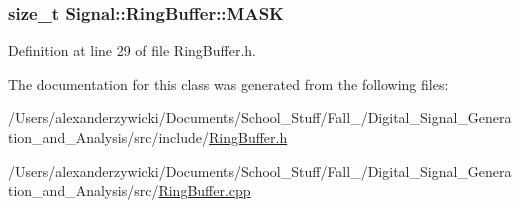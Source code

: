 \hypertarget{class_signal_1_1_ring_buffer_a6f0dc159e6d625b8352988c6a0577ffe}{
\subsubsection[{M\+A\+S\+K}]{\setlength{\rightskip}{0pt plus 5cm}size\+\_\+t Signal\+::\+Ring\+Buffer\+::\+M\+A\+S\+K\hspace{0.3cm}{\ttfamily [protected]}}}\label{class_signal_1_1_ring_buffer_a6f0dc159e6d625b8352988c6a0577ffe}


Definition at line 29 of file Ring\+Buffer.\+h.



The documentation for this class was generated from the following files\+:\begin{DoxyCompactItemize}
\item 
/\+Users/alexanderzywicki/\+Documents/\+School\+\_\+\+Stuff/\+Fall\+\_/\+Digital\+\_\+\+Signal\+\_\+\+Generation\+\_\+and\+\_\+\+Analysis/src/include/\hyperlink{_ring_buffer_8h}{Ring\+Buffer.\+h}\item 
/\+Users/alexanderzywicki/\+Documents/\+School\+\_\+\+Stuff/\+Fall\+\_/\+Digital\+\_\+\+Signal\+\_\+\+Generation\+\_\+and\+\_\+\+Analysis/src/\hyperlink{_ring_buffer_8cpp}{Ring\+Buffer.\+cpp}\end{DoxyCompactItemize}
